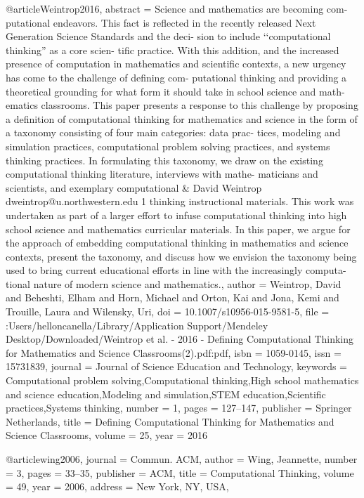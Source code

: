 @article{Weintrop2016,
abstract = {Science and mathematics are becoming com- putational endeavors. This fact is reflected in the recently released Next Generation Science Standards and the deci- sion to include ‘‘computational thinking'' as a core scien- tific practice. With this addition, and the increased presence of computation in mathematics and scientific contexts, a new urgency has come to the challenge of defining com- putational thinking and providing a theoretical grounding for what form it should take in school science and math- ematics classrooms. This paper presents a response to this challenge by proposing a definition of computational thinking for mathematics and science in the form of a taxonomy consisting of four main categories: data prac- tices, modeling and simulation practices, computational problem solving practices, and systems thinking practices. In formulating this taxonomy, we draw on the existing computational thinking literature, interviews with mathe- maticians and scientists, and exemplary computational {\&} David Weintrop dweintrop@u.northwestern.edu 1 thinking instructional materials. This work was undertaken as part of a larger effort to infuse computational thinking into high school science and mathematics curricular materials. In this paper, we argue for the approach of embedding computational thinking in mathematics and science contexts, present the taxonomy, and discuss how we envision the taxonomy being used to bring current educational efforts in line with the increasingly computa- tional nature of modern science and mathematics.},
author = {Weintrop, David and Beheshti, Elham and Horn, Michael and Orton, Kai and Jona, Kemi and Trouille, Laura and Wilensky, Uri},
doi = {10.1007/s10956-015-9581-5},
file = {:Users/helloncanella/Library/Application Support/Mendeley Desktop/Downloaded/Weintrop et al. - 2016 - Defining Computational Thinking for Mathematics and Science Classrooms(2).pdf:pdf},
isbn = {1059-0145},
issn = {15731839},
journal = {Journal of Science Education and Technology},
keywords = {Computational problem solving,Computational thinking,High school mathematics and science education,Modeling and simulation,STEM education,Scientific practices,Systems thinking},
number = {1},
pages = {127--147},
publisher = {Springer Netherlands},
title = {{Defining Computational Thinking for Mathematics and Science Classrooms}},
volume = {25},
year = {2016}
}



@article{wing2006,
	journal = {Commun. ACM},
	author = {Wing, Jeannette},
	number = {3},
	pages = {33--35},
	publisher = {ACM},
	title = {{Computational Thinking}},
	volume = {49},
	year = {2006},
	address = {New York, NY, USA},
}


